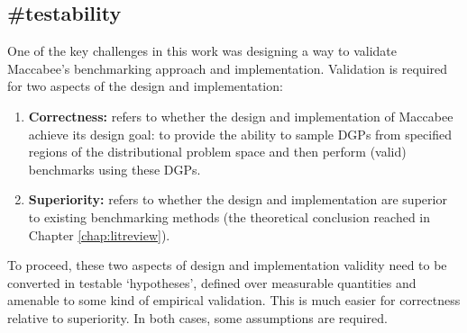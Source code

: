 \documentclass[./main.tex]{subfiles}
\begin{document}

\subsection*{\textbf{\#testability}}
\label{hc:testability}

One of the key challenges in this work was designing a way to validate Maccabee's benchmarking approach and implementation. Validation is required for two aspects of the design and implementation:

\begin{enumerate}
    \item \textbf{Correctness:} refers to whether the design and implementation of Maccabee achieve its design goal: to provide the ability to sample DGPs from specified regions of the distributional problem space and then perform (valid) benchmarks using these DGPs.
    
    \item \textbf{Superiority:} refers to whether the design and implementation are superior to existing benchmarking methods (the theoretical conclusion reached in Chapter \ref{chap:litreview}).
\end{enumerate}

To proceed, these two aspects of design and implementation validity need to be converted in testable `hypotheses', defined over measurable quantities and amenable to some kind of empirical validation. This is much easier for correctness relative to superiority. In both cases, some assumptions are required.
\end{document}
